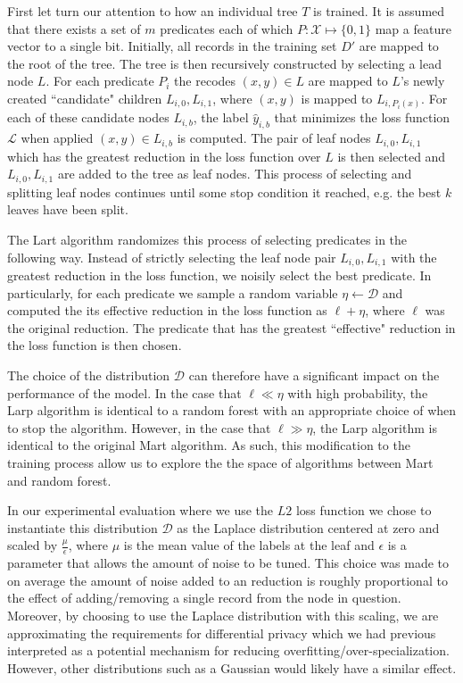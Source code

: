 \documentclass{article} %
\begin{document}
First let turn our attention to how an individual tree $T$ is trained. It is assumed that there exists a set of $m$ predicates each of which $P:\mathcal{X} \mapsto \{0,1\}$ map a feature vector to a single bit.  Initially, all records in the training set $D'$ are mapped to the root of the tree. The tree is then recursively constructed by selecting a lead node $L$. For each predicate $P_i$ the recodes $(x,y)\in L$ are mapped to $L$'s newly created ``candidate" children $L_{i,0},L_{i,1}$, where $(x,y)$ is mapped to $L_{i,P_i(x)}$. For each of these candidate nodes $L_{i,b}$, the label $\hat{y}_{i,b}$ that minimizes the loss function $\mathcal{L}$ when applied $(x,y)\in L_{i,b}$ is computed. The pair of leaf nodes $L_{i,0}, L_{i,1}$ which has the greatest reduction in the loss function over $L$ is then selected and $L_{i,0}, L_{i,1}$ are added to the tree as leaf nodes. This process of selecting and splitting leaf nodes continues until some stop condition it reached, e.g. the best $k$ leaves have been split.

The Lart algorithm randomizes this process of selecting predicates in the following way. Instead of strictly selecting the leaf node pair $L_{i,0}, L_{i,1}$ with the greatest reduction in the loss function, we noisily select the best predicate. In particularly, for each predicate we sample a random variable $\eta\gets \mathcal{D}$ and computed the its effective reduction in the loss function as $\ell + \eta$, where $\ell$ was the original reduction. The predicate that has the greatest ``effective" reduction in the loss function is then chosen.

The choice of the distribution $\mathcal{D}$ can therefore have a significant impact on the performance of the model. In the case that $\ell \ll \eta$ with high probability,  the Larp algorithm is identical to a random forest with an appropriate choice of when to stop the algorithm. However, in the case that $\ell \gg \eta$, the Larp algorithm is identical to the original Mart algorithm. As such, this modification to the training process allow us to explore the the space of algorithms between Mart and random forest.

In our experimental evaluation where we use the $L2$ loss function we chose to instantiate this distribution $\mathcal{D}$ as the Laplace distribution centered at zero and scaled by $\frac{\mu}{\epsilon}$, where $\mu$ is the mean value of the labels at the leaf and $\epsilon$ is a parameter that allows the amount of noise to be tuned. This choice was made to on average the amount of noise added to an reduction is roughly proportional to the effect of adding/removing a single record from the node in question. Moreover, by choosing to use the Laplace distribution with this scaling, we are approximating the requirements for differential privacy which we had previous interpreted as a potential mechanism for reducing overfitting/over-specialization. However, other distributions such as a Gaussian would likely have a similar effect. 
\end{document}
